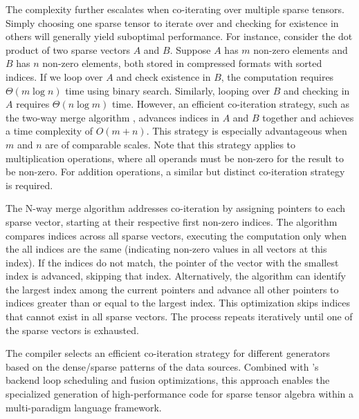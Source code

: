 \documentclass[acmsmall,nonacm]{acmart}\settopmatter{printfolios=true,printccs=false,printacmref=false}
\newcommand{\rhyme}{\text{Rhyme}\xspace}
\begin{document}
The complexity further escalates when co-iterating over multiple sparse tensors. Simply choosing one sparse tensor to iterate over and checking for existence in others will generally yield suboptimal performance. For instance, consider the dot product of two sparse vectors $A$ and $B$. Suppose $A$ has $m$ non-zero elements and $B$ has $n$ non-zero elements, both stored in compressed formats with sorted indices. If we loop over $A$ and check existence in $B$, the computation requires $\Theta(m\log{}n)$ time using binary search. Similarly, looping over $B$ and checking in $A$ requires $\Theta(n\log{}m)$ time. However, an efficient co-iteration strategy, such as the two-way merge algorithm \cite{knuth}, advances indices in $A$ and $B$ together and achieves a time complexity of $O(m + n)$. This strategy is especially advantageous when $m$ and $n$ are of comparable scales. Note that this strategy applies to multiplication operations, where all operands must be non-zero for the result to be non-zero. For addition operations, a similar but distinct co-iteration strategy is required.\par
The N-way merge algorithm addresses co-iteration by assigning pointers to each sparse vector, starting at their respective first non-zero indices. The algorithm compares indices across all sparse vectors, executing the computation only when the all indices are the same (indicating non-zero values in all vectors at this index). If the indices do not match, the pointer of the vector with the smallest index is advanced, skipping that index. Alternatively, the algorithm can identify the largest index among the current pointers and advance all other pointers to indices greater than or equal to the largest index. This optimization skips indices that cannot exist in all sparse vectors. The process repeats iteratively until one of the sparse vectors is exhausted.\par
The \rhyme compiler selects an efficient co-iteration strategy for different generators based on the dense/sparse patterns of the data sources. Combined with \rhyme's backend loop scheduling and fusion optimizations, this approach enables the specialized generation of high-performance code for sparse tensor algebra within a multi-paradigm language framework.
\end{document}
